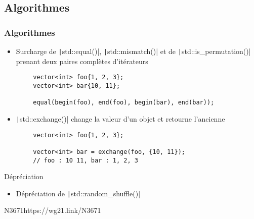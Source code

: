 \documentclass[C++.tex]{subfiles}
\begin{document}
\subsection*{Algorithmes}
\begin{frame}[fragile]
	\frametitle{Algorithmes}
	\begin{itemize}
		\item Surcharge de \texttt|std::equal()|, \texttt|std::mismatch()| et de \texttt|std::is_permutation()| prenant deux paires complètes d'itérateurs

	\end{itemize}

	\begin{verbatim}
		vector<int> foo{1, 2, 3};
		vector<int> bar{10, 11};

		equal(begin(foo), end(foo), begin(bar), end(bar));
	\end{verbatim}

	\begin{itemize}
		\item \texttt|std::exchange()| change la valeur d'un objet et retourne l'ancienne
	\end{itemize}

	\begin{verbatim}
		vector<int> foo{1, 2, 3};

		vector<int> bar = exchange(foo, {10, 11});
		// foo : 10 11, bar : 1, 2, 3
	\end{verbatim}

	\begin{block}{Dépréciation}
		\begin{itemize}
			\item Dépréciation de \texttt|std::random_shuffle()|
		\end{itemize}

	\end{block}

		{N3671}{https://wg21.link/N3671}
\end{frame}
\end{document}
